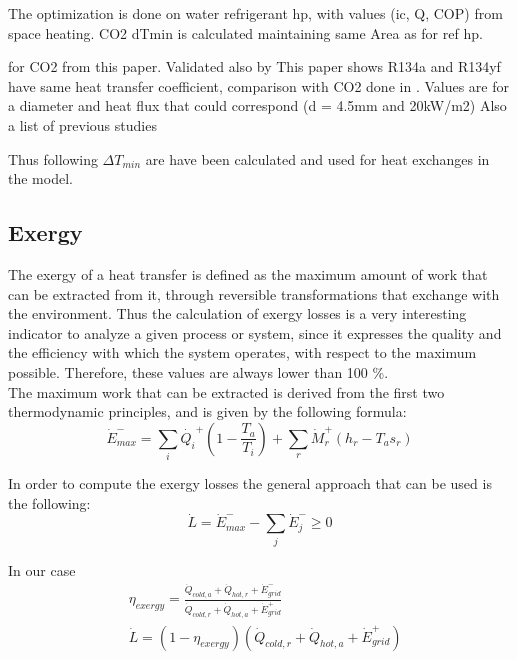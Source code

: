 \documentclass{article}
\begin{document}
The optimization is done on water refrigerant hp, with values (ic, Q, COP) from space heating. 
CO2 dTmin is calculated maintaining same Area as for ref hp.

for CO2 from this paper\cite{ohFlowBoilingHeat2011}.
Validated also by 
This paper shows R134a and R134yf have same heat transfer coefficient\cite{wangOverviewHeatTransfer2013}, comparison with CO2 done in \cite{mastrulloComparisonR744R134a2009}.
Values are for a diameter and heat flux that could correspond (d = 4.5mm and 20kW/m2)
Also a list of previous studies



Thus following $\Delta T_{min}$ are have been calculated and used for heat exchanges in the model.


\subsection{Exergy}
The exergy of a heat transfer is defined as the maximum amount of work that can be extracted from it, through reversible transformations that exchange with the environment. Thus the calculation of exergy losses is a very interesting indicator to analyze a given process or system, since it expresses the quality and the efficiency with which the system operates, with respect to the maximum possible. Therefore, these values are always lower than 100 \%. \\

The maximum work that can be extracted is derived from the first two thermodynamic principles, and is given by the following formula:
\begin{equation}
    \dot{E}^{-}_{max} = \sum_{i} \dot{Q_i}^{+} (1 - \frac{T_{a}}{T_i} ) + \sum_{r} \dot{M}_{r}^{+} (h_{r} - T_{a} s_{r})    
\end{equation}

In order to compute the exergy losses the general approach that can be used is the following:
\begin{equation}
    \dot{L} = \dot{E}^{-}_{max} - \sum_{j}\dot{E}^{-}_{j} \geq 0
\end{equation}

In our case
\begin{align}
    & \eta_{exergy} =  \frac{\dot{Q}_{cold,a} + \dot{Q}_{hot,r} + \dot{E}_{grid}^{-}}{\dot{Q}_{cold,r} + \dot{Q}_{hot,a} + \dot{E}_{grid}^{+}}  \\
    & \dot{L} = (1-\eta_{exergy})(\dot{Q}_{cold,r} + \dot{Q}_{hot,a} + \dot{E}_{grid}^{+})
\end{align}
\end{document}
